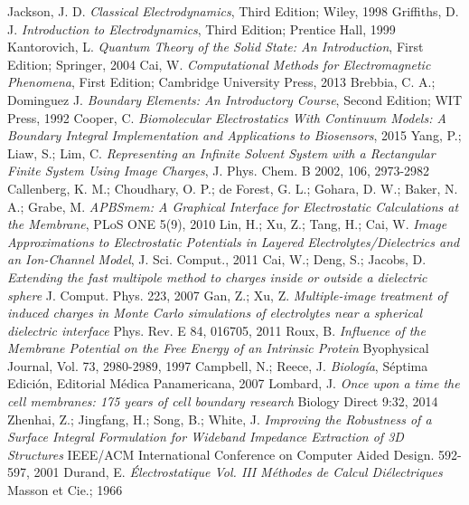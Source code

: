\documentclass[12pt, notitlepage]{article}
\numberwithin{equation}{section}
\begin{document}
\begin{thebibliography}{20}
Jackson, J. D. \textit{Classical Electrodynamics}, Third Edition; Wiley, 1998
Griffiths, D. J. \textit{Introduction to Electrodynamics}, Third Edition; Prentice Hall, 1999
Kantorovich, L. \textit{Quantum Theory of the Solid State: An Introduction}, First Edition; Springer, 2004
Cai, W. \textit{Computational Methods for Electromagnetic Phenomena}, First Edition; Cambridge University Press, 2013
Brebbia, C. A.; Dominguez J. \textit{Boundary Elements: An Introductory Course}, Second Edition; WIT Press, 1992
Cooper, C. \textit{Biomolecular Electrostatics With Continuum Models: A Boundary Integral Implementation and Applications to Biosensors}, 2015
Yang, P.; Liaw, S.; Lim, C. \textit{Representing an Infinite Solvent System with a Rectangular Finite System Using Image Charges}, J. Phys. Chem. B 2002, 106, 2973-2982
Callenberg, K. M.; Choudhary, O. P.; de Forest, G. L.; Gohara, D. W.; Baker, N. A.; Grabe, M. \textit{APBSmem: A Graphical Interface for Electrostatic Calculations at the Membrane}, PLoS ONE 5(9), 2010
Lin, H.; Xu, Z.; Tang, H.; Cai, W. \textit{Image Approximations to Electrostatic Potentials in Layered Electrolytes/Dielectrics and an Ion-Channel Model}, J. Sci. Comput., 2011
Cai, W.; Deng, S.; Jacobs, D. \textit{Extending the fast multipole method to charges inside or outside a dielectric sphere} J. Comput. Phys. 223, 2007
Gan, Z.; Xu, Z. \textit{Multiple-image treatment of induced charges in Monte Carlo simulations of electrolytes near a spherical dielectric interface} Phys. Rev. E 84, 016705, 2011
Roux, B. \textit{Influence of the Membrane Potential on the Free Energy of an Intrinsic Protein} Byophysical Journal, Vol. 73, 2980-2989, 1997
Campbell, N.; Reece, J. \textit{Biología}, Séptima Edición, Editorial Médica Panamericana, 2007
Lombard, J. \textit{Once upon a time the cell membranes: 175 years of cell boundary research} Biology Direct 9:32, 2014
Zhenhai, Z.; Jingfang, H.; Song, B.; White, J. \textit{Improving the Robustness of a Surface Integral Formulation for Wideband Impedance Extraction of 3D Structures} IEEE/ACM International Conference on Computer Aided Design. 592-597, 2001 
Durand, E. \textit{Électrostatique Vol. III Méthodes de Calcul Diélectriques} Masson et Cie.; 1966
\end{thebibliography}


\end{document}

